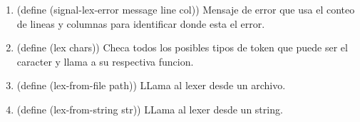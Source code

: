 \documentclass{article}
\begin{document}
\begin{enumerate}
    \item (define (signal-lex-error message line col))
    Mensaje de error que usa el conteo de lineas y columnas para identificar donde esta el error.

    \item (define (lex chars))
    Checa todos los posibles tipos de token que puede ser el caracter y llama a su respectiva funcion.

    \item (define (lex-from-file path))
    LLama al lexer desde un archivo.
    
    \item (define (lex-from-string str))
    LLama al lexer desde un string.
\end{enumerate}
\end{document}
